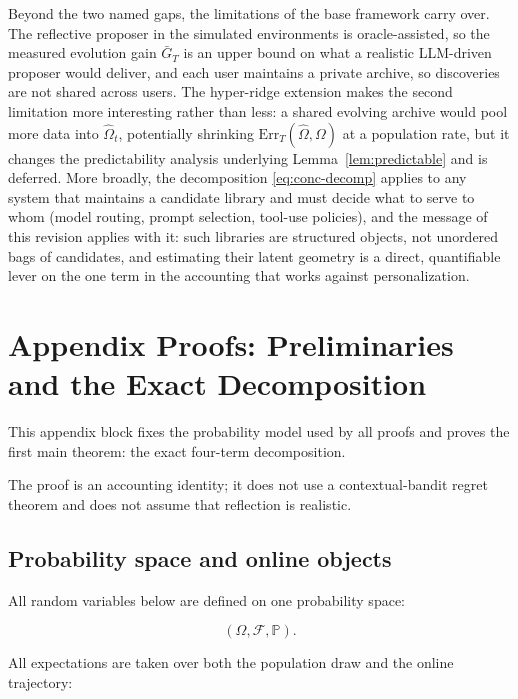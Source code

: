 \documentclass{article} %
\begin{document}
Beyond the two named gaps, the limitations of the base framework carry over. The reflective proposer in the simulated environments is oracle-assisted, so the measured evolution gain $\bar G_T$ is an upper bound on what a realistic LLM-driven proposer would deliver, and each user maintains a private archive, so discoveries are not shared across users. The hyper-ridge extension makes the second limitation more interesting rather than less: a shared evolving archive would pool more data into $\widehat\Omega_t$, potentially shrinking $\mathrm{Err}_T(\widehat\Omega,\Omega)$ at a population rate, but it changes the predictability analysis underlying Lemma~\ref{lem:predictable} and is deferred. More broadly, the decomposition \eqref{eq:conc-decomp} applies to any system that maintains a candidate library and must decide what to serve to whom (model routing, prompt selection, tool-use policies), and the message of this revision applies with it: such libraries are structured objects, not unordered bags of candidates, and estimating their latent geometry is a direct, quantifiable lever on the one term in the accounting that works against personalization.

\appendix

\section{Appendix Proofs: Preliminaries and the Exact Decomposition}

\label{app:proofs}

This appendix block fixes the probability model used by all proofs and proves the first main theorem: the exact four-term decomposition.

The proof is an accounting identity; it does not use a contextual-bandit regret theorem and does not assume that reflection is realistic.

\subsection{Probability space and online objects}

All random variables below are defined on one probability space:

\begin{equation}
\label{eq:app-probability-space}
(\Omega,\mathcal{F},\mathbb{P}).
\end{equation}

All expectations are taken over both the population draw and the online trajectory:
\end{document}

